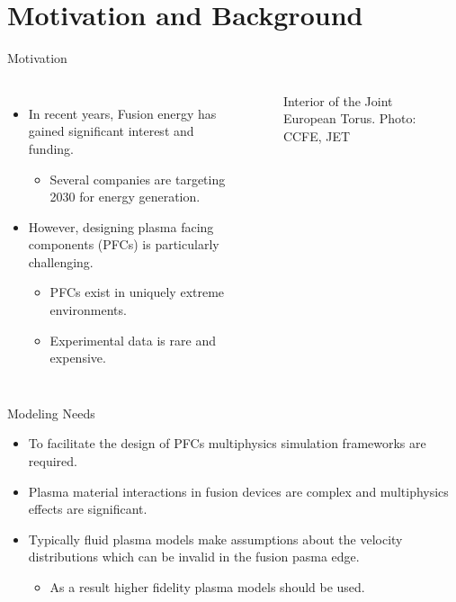 \documentclass[aspectratio=169, 16pt]{beamer}
\begin{document}
\section{Motivation and Background}
\begin{frame}{Motivation}
  \vspace{1cm}
  \begin{columns}
    \begin{itemize}
      \item In recent years, Fusion energy has gained significant interest and funding.
      \begin{itemize}
        \item Several companies are targeting 2030 for energy generation.
      \end{itemize}
      \item However, designing plasma facing components (PFCs) is particularly challenging.
      \begin{itemize}
        \item PFCs exist in uniquely extreme environments.
        \item Experimental data is rare and expensive.
      \end{itemize}
    \end{itemize}
      \begin{figure}[H]
        \centering
        \caption{Interior of the Joint European Torus. Photo: CCFE, JET}
    \end{figure}
  \end{columns}
\end{frame}

\begin{frame}{Modeling Needs}
  \vspace{1cm}
  \begin{itemize}
    \item To facilitate the design of PFCs multiphysics simulation frameworks are required\cite{carter2020powering}.
    \item Plasma material interactions in fusion devices are complex and multiphysics effects are significant.
    \item Typically fluid plasma models make assumptions about the velocity distributions which can be invalid in the fusion pasma edge.
    \begin{itemize}
      \item As a result higher fidelity plasma models should be used.
    \end{itemize}
  \end{itemize}
\end{frame}
\end{document}
